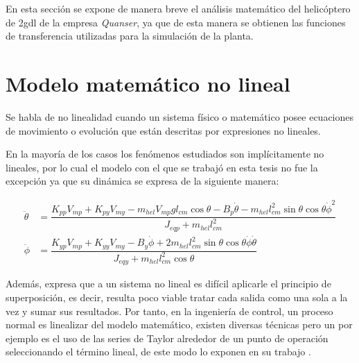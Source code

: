 \label{app:model math}

En esta sección se expone de manera breve el análisis matemático del helicóptero de \acrfull{2gdl} de la empresa \textit{Quanser}, ya que de esta manera se obtienen las funciones de transferencia utilizadas para la simulación de la planta.

\section{Modelo matemático no lineal}

Se habla de no linealidad cuando un sistema físico o matemático posee ecuaciones de movimiento o evolución que están descritas por expresiones no lineales.

En la mayoría de los casos los fenómenos estudiados son implícitamente no lineales, por lo cual el modelo con el que se trabajó en esta tesis no fue la excepción ya que su dinámica se expresa de la siguiente manera:

\begin{align}
   \label{equa:ddot-theta2}
   \ddot{\theta} &= \dfrac{K_{pp}V_{mp}+K_{py}V_{my}-m_{hel}V_{mp}gl_{cm}\cos\theta - B_p\dot{\theta}- m_{hel}l_{cm}^2\sin\theta\cos\theta\dot{\phi}^2} {J_{eqp}+m_{hel}l_{cm}^2} \\
   \label{equa:ddot-phi2}
   \ddot{\phi} &= \dfrac{K_{yp}V_{mp}+K_{yy}V_{my}-B_y\dot{\phi}+2m_{hel}l_{cm}^2\sin\theta\cos\theta\dot{\phi}\dot{\theta}} {J_{eqy}+m_{hel}l_{cm}^2\cos\theta}
\end{align}

Además, \citet[pp. 42-43]{Ogata2010} expresa que a un sistema no lineal es difícil aplicarle el principio de superposición, es decir, resulta poco viable tratar cada salida como una sola a la vez y sumar sus resultados. Por tanto, en la ingeniería de control, un proceso normal es linealizar del modelo matemático, existen diversas técnicas pero un por ejemplo es el uso de las series de Taylor alrededor de un punto de operación seleccionando el término lineal, de este modo lo exponen en su trabajo \citet{VillarealGrajales2017}.